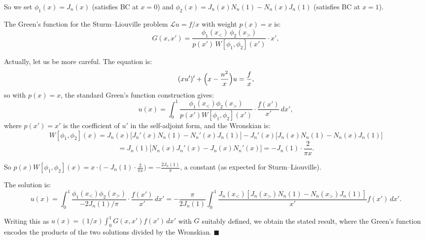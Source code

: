 \documentclass[12pt]{article}
\begin{document}
So we set $\phi_1(x) = J_n(x)$ (satisfies BC at $x=0$) and $\phi_2(x) = J_n(x)N_n(1) - N_n(x)J_n(1)$ (satisfies BC at $x=1$).

The Green's function for the Sturm--Liouville problem $\mathcal{L}u = f/x$ with weight $p(x)=x$ is:
\[
G(x,x') = \frac{\phi_1(x_<)\,\phi_2(x_>)}{p(x')\,W[\phi_1,\phi_2](x')} \cdot x',
\]

Actually, let us be more careful. The equation is:
\[
(xu')' + \Bigl(x - \frac{n^2}{x}\Bigr)u = \frac{f}{x},
\]
so with $p(x) = x$, the standard Green's function construction gives:
\[
u(x) = \int_0^1 \frac{\phi_1(x_<)\phi_2(x_>)}{p(x')W[\phi_1,\phi_2](x')}\cdot\frac{f(x')}{x'}\,dx',
\]
where $p(x') = x'$ is the coefficient of $u'$ in the self-adjoint form, and the Wronskian is:
\[
W[\phi_1,\phi_2](x) = J_n(x)\bigl[J_n'(x)N_n(1) - N_n'(x)J_n(1)\bigr] - J_n'(x)\bigl[J_n(x)N_n(1) - N_n(x)J_n(1)\bigr]
\]
\[
= J_n(1)\bigl[N_n(x)J_n'(x) - J_n(x)N_n'(x)\bigr] = -J_n(1)\cdot\frac{2}{\pi x}.
\]

So $p(x)W[\phi_1,\phi_2](x) = x \cdot \bigl(-J_n(1)\cdot\frac{2}{\pi x}\bigr) = -\frac{2J_n(1)}{\pi}$, a constant (as expected for Sturm--Liouville).

The solution is:
\[
u(x) = \int_0^1 \frac{\phi_1(x_<)\phi_2(x_>)}{-2J_n(1)/\pi}\cdot\frac{f(x')}{x'}\,dx' = -\frac{\pi}{2J_n(1)}\int_0^1 \frac{J_n(x_<)[J_n(x_>)N_n(1) - N_n(x_>)J_n(1)]}{x'}f(x')\,dx'.
\]

Writing this as $u(x) = (1/x)\int_0^1 G(x,x')f(x')\,dx'$ with $G$ suitably defined, we obtain the stated result, where the Green's function encodes the products of the two solutions divided by the Wronskian. $\blacksquare$
\end{document}
